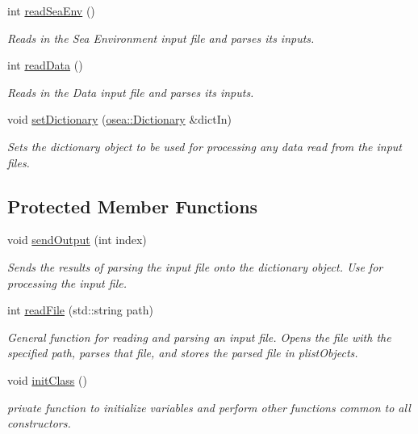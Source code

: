 \begin{DoxyCompactItemize}
int \hyperlink{classosea_1_1_file_reader_a1f8a6bd4b5c53f80cc94d64d6dd1f2da}{read\-Sea\-Env} ()
\begin{DoxyCompactList}\small\item\em Reads in the Sea Environment input file and parses its inputs. \end{DoxyCompactList}\item 
int \hyperlink{classosea_1_1_file_reader_a814f8b06adcc190d4042509797eef6d2}{read\-Data} ()
\begin{DoxyCompactList}\small\item\em Reads in the Data input file and parses its inputs. \end{DoxyCompactList}\item 
void \hyperlink{classosea_1_1_file_reader_a3cbdb7eab632abafcfd055aa92f47b73}{set\-Dictionary} (\hyperlink{classosea_1_1_dictionary}{osea\-::\-Dictionary} \&dict\-In)
\begin{DoxyCompactList}\small\item\em Sets the dictionary object to be used for processing any data read from the input files. \end{DoxyCompactList}\end{DoxyCompactItemize}
\subsection*{Protected Member Functions}
\begin{DoxyCompactItemize}
\item 
void \hyperlink{classosea_1_1_file_reader_aa57b483154b47ad0126d97debb53c638}{send\-Output} (int index)
\begin{DoxyCompactList}\small\item\em Sends the results of parsing the input file onto the dictionary object. Use for processing the input file. \end{DoxyCompactList}\item 
int \hyperlink{classosea_1_1_file_reader_a32a9d75323fff2c692583d59b6709c63}{read\-File} (std\-::string path)
\begin{DoxyCompactList}\small\item\em General function for reading and parsing an input file. Opens the file with the specified path, parses that file, and stores the parsed file in plist\-Objects. \end{DoxyCompactList}\item 
void \hyperlink{classosea_1_1_file_reader_ae59b36eb68173f83f9a57f3a17ab8d52}{init\-Class} ()
\begin{DoxyCompactList}\small\item\em private function to initialize variables and perform other functions common to all constructors. \end{DoxyCompactList}\end{DoxyCompactItemize}
